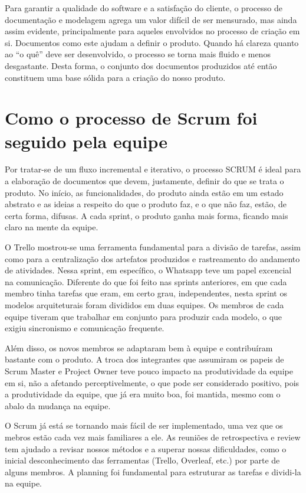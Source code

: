 \documentclass[12pt]{article}
\begin{document}
Para garantir a qualidade do software e a satisfação do cliente, o processo de documentação e modelagem agrega um valor difícil de ser mensurado, mas ainda assim evidente, principalmente para aqueles envolvidos no processo de criação em si. Documentos como este ajudam a definir o produto. Quando há clareza quanto ao “o quê” deve ser desenvolvido, o processo se torna mais fluido e menos desgastante. Desta forma, o conjunto dos documentos produzidos até então constituem uma base sólida para a criação do nosso produto.

\section{Como o processo de Scrum foi seguido pela equipe}
Por tratar-se de um fluxo incremental e iterativo, o processo SCRUM é ideal para a elaboração de documentos que devem, justamente, definir do que se trata o produto. No início, as funcionalidades, do produto ainda estão em um estado abstrato e as ideias a respeito do que o produto faz, e o que não faz, estão, de certa forma, difusas. A cada sprint, o produto ganha mais forma, ficando mais claro na mente da equipe.

O Trello mostrou-se uma ferramenta fundamental para a divisão de tarefas, assim como para a centralização dos artefatos produzidos e rastreamento do andamento de atividades. Nessa sprint, em específico, o Whatsapp teve um papel excencial na comunicação. Diferente do que foi feito nas sprints anteriores, em que cada membro tinha tarefas que eram, em certo grau, independentes, nesta sprint os modelos arquiteturais foram divididos em duas equipes. Os membros de cada equipe tiveram que trabalhar em conjunto para produzir cada modelo, o que exigiu sincronismo e comunicação frequente. 

Além disso, os novos membros se adaptaram bem à equipe e contribuíram bastante com o produto. A troca dos integrantes que assumiram os papeis de Scrum Master e Project Owner teve pouco impacto na produtividade da equipe em si, não a afetando perceptivelmente, o que pode ser considerado positivo, pois a produtividade da equipe, que já era muito boa, foi mantida, mesmo com o abalo da mudança na equipe.

O Scrum já está se tornando mais fácil de ser implementado, uma vez que os mebros estão cada vez mais familiares a ele. As reuniões de retrospectiva e review tem ajudado a revisar nossos métodos e a superar nossas dificuldades, como o inicial desconhecimento das ferramentas (Trello, Overleaf, etc.) por parte de alguns membros. A planning foi fundamental para estruturar as tarefas e dividi-la na equipe. 




\end{document}
